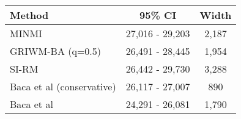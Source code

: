 
\begin{tabular}{lcc}
\toprule
Method & 95\% CI & Width\\
\midrule
MINMI & 27,016 - 29,203 & 2,187\\
GRIWM-BA (q=0.5) & 26,491 - 28,445 & 1,954\\
SI-RM & 26,442 - 29,730 & 3,288\\
Baca et al (conservative) & 26,117 - 27,007 & 890\\
Baca et al & 24,291 - 26,081 & 1,790\\
\bottomrule
\end{tabular}
